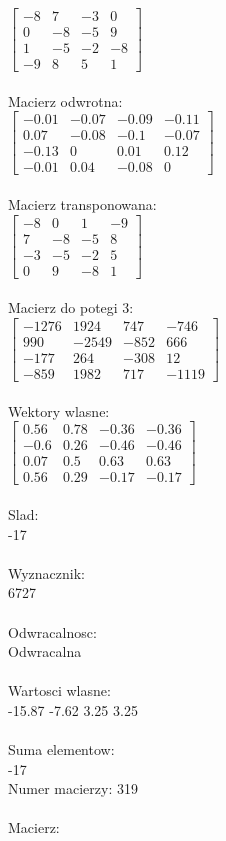 \documentclass[a4paper,12pt]{article}
\begin{document}
$\begin{bmatrix} -8&7&-3&0\\0&-8&-5&9\\1&-5&-2&-8\\-9&8&5&1 \end{bmatrix}$
\\
\\
Macierz odwrotna:\\

$\begin{bmatrix} -0.01&-0.07&-0.09&-0.11\\0.07&-0.08&-0.1&-0.07\\-0.13&0&0.01&0.12\\-0.01&0.04&-0.08&0 \end{bmatrix}$
\\
\\
Macierz transponowana:\\

$\begin{bmatrix} -8&0&1&-9\\7&-8&-5&8\\-3&-5&-2&5\\0&9&-8&1 \end{bmatrix}$
\\
\\
Macierz do potegi 3:\\

$\begin{bmatrix} -1276&1924&747&-746\\990&-2549&-852&666\\-177&264&-308&12\\-859&1982&717&-1119 \end{bmatrix}$
\\
\\
Wektory wlasne:\\

$\begin{bmatrix} 0.56&0.78&-0.36&-0.36\\-0.6&0.26&-0.46&-0.46\\0.07&0.5&0.63&0.63\\0.56&0.29&-0.17&-0.17 \end{bmatrix}$
\\
\\
Slad:\\
-17
\\
\\
Wyznacznik:\\
6727
\\
\\
Odwracalnosc:\\
Odwracalna
\\
\\
Wartosci wlasne:\\
-15.87 -7.62 3.25 3.25
\\
\\
Suma elementow:\\
-17
\\
\newpage
Numer macierzy:
319
\\
\\
Macierz:\\
\end{document}
